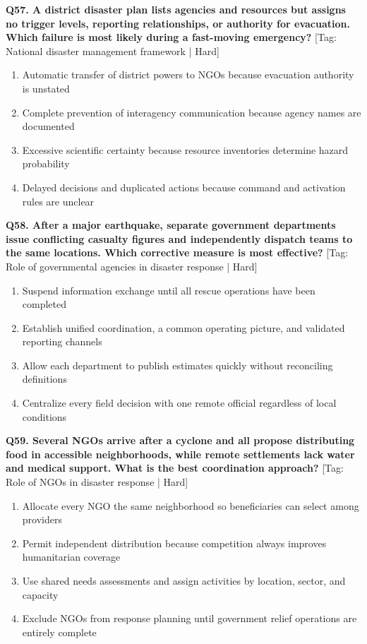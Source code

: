 \noindent\textbf{Q57. A district disaster plan lists agencies and resources but assigns no trigger levels, reporting relationships, or authority for evacuation. Which failure is most likely during a fast-moving emergency?} \hfill [Tag: National disaster management framework | Hard]
\begin{enumerate}[label=(\alph*),topsep=2pt,itemsep=1pt,partopsep=0pt,parsep=0pt]
    \item {Automatic transfer of district powers to NGOs because evacuation authority is unstated}
    \item {Complete prevention of interagency communication because agency names are documented}
    \item {Excessive scientific certainty because resource inventories determine hazard probability}
    \item {Delayed decisions and duplicated actions because command and activation rules are unclear}
\end{enumerate}
\vspace{2mm}

\noindent\textbf{Q58. After a major earthquake, separate government departments issue conflicting casualty figures and independently dispatch teams to the same locations. Which corrective measure is most effective?} \hfill [Tag: Role of governmental agencies in disaster response | Hard]
\begin{enumerate}[label=(\alph*),topsep=2pt,itemsep=1pt,partopsep=0pt,parsep=0pt]
    \item {Suspend information exchange until all rescue operations have been completed}
    \item {Establish unified coordination, a common operating picture, and validated reporting channels}
    \item {Allow each department to publish estimates quickly without reconciling definitions}
    \item {Centralize every field decision with one remote official regardless of local conditions}
\end{enumerate}
\vspace{2mm}

\noindent\textbf{Q59. Several NGOs arrive after a cyclone and all propose distributing food in accessible neighborhoods, while remote settlements lack water and medical support. What is the best coordination approach?} \hfill [Tag: Role of NGOs in disaster response | Hard]
\begin{enumerate}[label=(\alph*),topsep=2pt,itemsep=1pt,partopsep=0pt,parsep=0pt]
    \item {Allocate every NGO the same neighborhood so beneficiaries can select among providers}
    \item {Permit independent distribution because competition always improves humanitarian coverage}
    \item {Use shared needs assessments and assign activities by location, sector, and capacity}
    \item {Exclude NGOs from response planning until government relief operations are entirely complete}
\end{enumerate}
\vspace{2mm}

